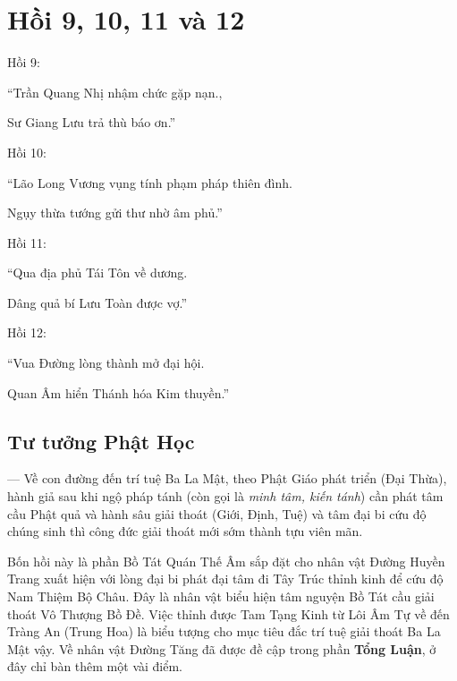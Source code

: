 \chapter{Hồi 9, 10, 11 và 12} %
\label{cha:hoi_9_10_11_và_12}
Hồi 9:

\begin{itshape}
``Trần Quang Nhị nhậm chức gặp nạn.,

Sư Giang Lưu trả thù báo ơn.''
\end{itshape}

Hồi 10:

\begin{itshape}
``Lão Long Vương vụng tính phạm pháp thiên đình.

Ngụy thừa tướng gửi thư nhờ âm phủ.''
\end{itshape}

Hồi 11:

\begin{itshape}
``Qua địa phủ Tái Tôn về dương.

Dâng quả bí Lưu Toàn được vợ.''
\end{itshape}

Hồi 12:

\begin{itshape}
``Vua Đường lòng thành mở đại hội.

Quan Âm hiển Thánh hóa Kim thuyền.''
\end{itshape}

\section{Tư tưởng Phật Học} %
\label{sec:9_phat_hoc}

--- Về con đường đến trí tuệ Ba La Mật, theo Phật Giáo phát triển (Đại Thừa), hành giả sau khi ngộ pháp tánh (còn gọi là \emph{minh tâm, kiến tánh}) cần phát tâm cầu Phật quả và hành sâu giải thoát (Giới, Định, Tuệ) và tâm đại bi cứu độ chúng sinh thì công đức giải thoát mới sớm thành tựu viên mãn.

Bốn hồi này là phần Bồ Tát Quán Thế Âm sắp đặt cho nhân vật Đường Huyền Trang xuất hiện với lòng đại bi phát đại tâm đi Tây Trúc thỉnh kinh để cứu độ Nam Thiệm Bộ Châu. Đây là nhân vật biểu hiện tâm nguyện Bồ Tát cầu giải thoát Vô Thượng Bồ Đề. Việc thỉnh được Tam Tạng Kinh từ Lôi Âm Tự về đến Tràng An (Trung Hoa) là biểu tượng cho mục tiêu đắc trí tuệ giải thoát Ba La Mật vậy. Về nhân vật Đường Tăng đã được đề cập trong phần {\bf Tổng Luận}, ở đây chỉ bàn thêm một vài điểm.

